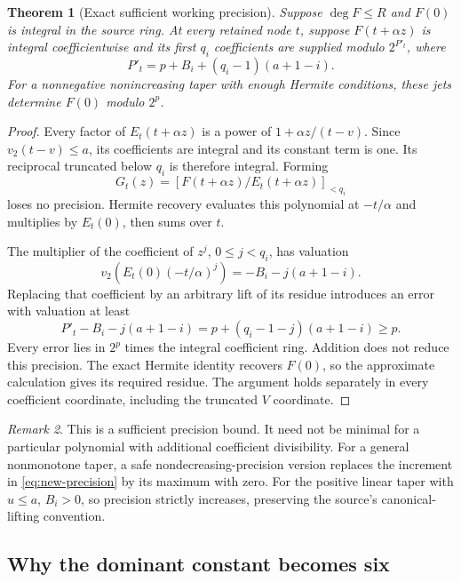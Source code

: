 \documentclass[11pt,letterpaper]{article}
\numberwithin{equation}{section}
\newtheorem{theorem}{Theorem}[section]
\theoremstyle{definition}
\theoremstyle{remark}
\newtheorem{remark}[theorem]{Remark}
\newcommand{\vTwo}{v_2}
\begin{document}
\begin{theorem}[Exact sufficient working precision]
\label{thm:precision}
Suppose $\deg F\le R$ and $F(0)$ is integral in the source ring.
At every retained node $t$, suppose $F(t+\alpha z)$ is integral
coefficientwise and its first $q_i$ coefficients are supplied modulo
$2^{P'_t}$, where
\begin{equation}
 \boxed{P'_t=p+B_i+(q_i-1)(a+1-i).}\label{eq:new-precision}
\end{equation}
For a nonnegative nonincreasing taper with enough Hermite conditions,
these jets determine $F(0)$ modulo $2^p$.
\end{theorem}
\begin{proof}
Every factor of $E_t(t+\alpha z)$ is a power of
$1+\alpha z/(t-v)$. Since $\vTwo(t-v)\le a$, its coefficients are integral
and its constant term is one. Its reciprocal truncated below $q_i$ is
therefore integral. Forming
\[
 G_t(z)=\left[F(t+\alpha z)/E_t(t+\alpha z)\right]_{<q_i}
\]
loses no precision. Hermite recovery evaluates this polynomial at
$-t/\alpha$ and multiplies by $E_t(0)$, then sums over $t$.

The multiplier of the coefficient of $z^j$, $0\le j<q_i$, has valuation
\[
 \vTwo\!\left(E_t(0)(-t/\alpha)^j\right)
       =-B_i-j(a+1-i).
\]
Replacing that coefficient by an arbitrary lift of its residue introduces
an error with valuation at least
\[
 P'_t-B_i-j(a+1-i)
       =p+(q_i-1-j)(a+1-i)\ge p.
\]
Every error lies in $2^p$ times the integral coefficient ring. Addition
does not reduce this precision. The exact Hermite identity recovers
$F(0)$, so the approximate calculation gives its required residue.
The argument holds separately in every coefficient coordinate, including
the truncated $V$ coordinate.
\end{proof}

\begin{remark}
This is a sufficient precision bound. It need not be minimal for a
particular polynomial with additional coefficient divisibility. For a
general nonmonotone taper, a safe nondecreasing-precision version replaces
the increment in \eqref{eq:new-precision} by its maximum with zero.
For the positive linear taper with $u\le a$, $B_i>0$, so precision strictly
increases, preserving the source's canonical-lifting convention.
\end{remark}

\subsection{Why the dominant constant becomes six}
\end{document}
